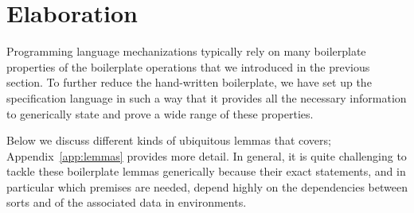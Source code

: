 \chapter{Elaboration}\label{ch:elaboration}
Programming language mechanizations typically rely on many boilerplate
properties of the boilerplate operations that we introduced in the previous
section. To further reduce the hand-written boilerplate, we have set up the
\Knot specification language in such a way that it provides all the necessary
information to generically state and prove a wide range of these
properties.


Below we discuss different kinds of ubiquitous lemmas that \Needle covers;
Appendix~\ref{app:lemmas} provides more detail. In general, it is quite
challenging to tackle these boilerplate lemmas generically because their exact
statements, and in particular which premises are needed, depend highly on the
dependencies between sorts and of the associated data in environments.








